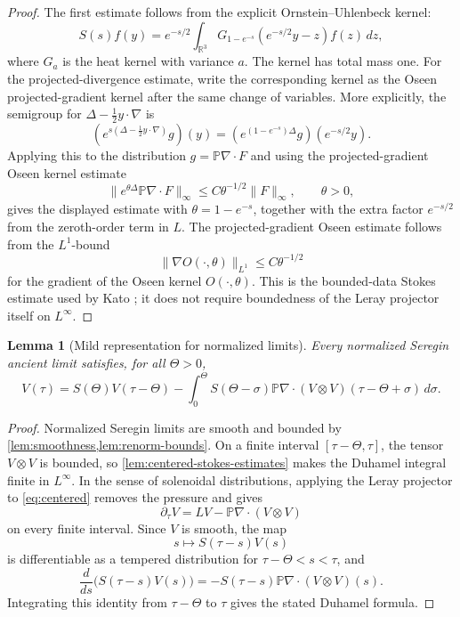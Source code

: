 \documentclass[11pt]{amsart}
\theoremstyle{plain}
\newtheorem{lemma}[theorem]{Lemma}
\theoremstyle{definition}
\theoremstyle{remark}
\numberwithin{equation}{section}
\newcommand{\R}{\mathbb R}
\begin{document}
\begin{proof}
The first estimate follows from the explicit Ornstein--Uhlenbeck kernel:
\[
   S(s)f(y)=e^{-s/2}
   \int_{\R^3}G_{1-e^{-s}}(e^{-s/2}y-z)f(z)\,dz,
\]
where \(G_a\) is the heat kernel with variance \(a\).  The kernel has total
mass one.  For the projected-divergence estimate, write the corresponding
kernel as the Oseen projected-gradient kernel after the same change of
variables.  More explicitly, the semigroup for
\(\Delta-\frac12y\cdot\nabla\) is
\[
   (e^{s(\Delta-\frac12y\cdot\nabla)}g)(y)
   =
   (e^{(1-e^{-s})\Delta}g)(e^{-s/2}y).
\]
Applying this to the distribution \(g=\mathbb P\nabla\cdot F\) and using the
projected-gradient Oseen kernel estimate
\[
   \|e^{\theta\Delta}\mathbb P\nabla\cdot F\|_\infty
   \le C\theta^{-1/2}\|F\|_\infty,\qquad \theta>0,
\]
gives the displayed estimate with \(\theta=1-e^{-s}\), together with the
extra factor \(e^{-s/2}\) from the zeroth-order term in \(L\).  The
projected-gradient Oseen estimate follows from the \(L^1\)-bound
\[
   \|\nabla O(\cdot,\theta)\|_{L^1}\le C\theta^{-1/2}
\]
for the gradient of the Oseen kernel \(O(\cdot,\theta)\).  This is the
bounded-data Stokes estimate used by Kato \cite{Kato1984}; it does not require
boundedness of the Leray projector itself on \(L^\infty\).
\end{proof}

\begin{lemma}[Mild representation for normalized limits]
\label{lem:mild-representation}
Every normalized Seregin ancient limit satisfies, for all \(\Theta>0\),
\[
   V(\tau)
   =
   S(\Theta)V(\tau-\Theta)
   -
   \int_0^\Theta
   S(\Theta-\sigma)\mathbb P\nabla\cdot
   (V\otimes V)(\tau-\Theta+\sigma)\,d\sigma .
\]
\end{lemma}

\begin{proof}
Normalized Seregin limits are smooth and bounded by
\cref{lem:smoothness,lem:renorm-bounds}.  On a finite interval
\([\tau-\Theta,\tau]\), the tensor \(V\otimes V\) is bounded, so
\cref{lem:centered-stokes-estimates} makes the Duhamel integral finite in
\(L^\infty\).  In the sense of solenoidal distributions, applying the Leray
projector to \eqref{eq:centered} removes the pressure and gives
\[
   \partial_\tau V=LV-\mathbb P\nabla\cdot(V\otimes V)
\]
on every finite interval.  Since \(V\) is smooth, the map
\[
   s\mapsto S(\tau-s)V(s)
\]
is differentiable as a tempered distribution for \(\tau-\Theta<s<\tau\), and
\[
   \frac{d}{ds}\bigl(S(\tau-s)V(s)\bigr)
   =
   -S(\tau-s)\mathbb P\nabla\cdot(V\otimes V)(s).
\]
Integrating this identity from \(\tau-\Theta\) to \(\tau\) gives the stated
Duhamel formula.
\end{proof}
\end{document}
